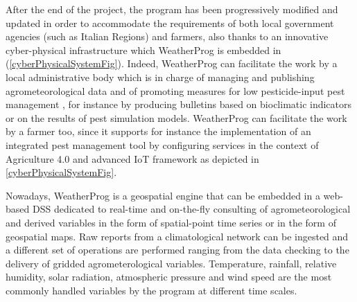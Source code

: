 \documentclass[authoryear,preprint,review,12pt]{elsarticle}
\begin{document}
After the end of the project, the program has been progressively modified and updated in order to accommodate the requirements of both local government agencies (such as Italian Regions) and farmers, also thanks to an innovative cyber-physical infrastructure which WeatherProg is embedded in (\cref{cyberPhysicalSystemFig}).
Indeed, WeatherProg can facilitate the work by a local administrative body which is in charge of managing and publishing agrometeorological data and of promoting measures for low pesticide-input pest management \citep{eu:dir128:2009}, for instance by producing bulletins based on bioclimatic indicators or on the results of pest simulation models.
WeatherProg can facilitate the work by a farmer too, since it supports for instance the implementation of an integrated pest management tool \citep{Terribile:dssvitis:2017} by configuring services in the context of Agriculture 4.0 and advanced IoT framework as depicted in \cref{cyberPhysicalSystemFig}.

Nowadays, WeatherProg is a geospatial engine that can be embedded in a web-based DSS dedicated to real-time and on-the-fly consulting of agrometeorological and derived variables in the form of spatial-point time series or in the form of geospatial maps.
Raw reports from a climatological network can be ingested and a different set of operations are performed ranging from the data checking to the delivery of gridded agrometerological variables.
Temperature, rainfall, relative humidity, solar radiation, atmospheric pressure and wind speed are the most commonly handled variables by the program at different time scales.
\end{document}
